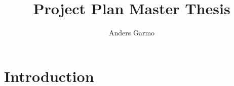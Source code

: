 \documentclass[a4paper, 10pt]{article}
\title{Project Plan Master Thesis}
\author{Anders Garmo}
\begin{document}
\maketitle

\section{Introduction}
\end{document}
